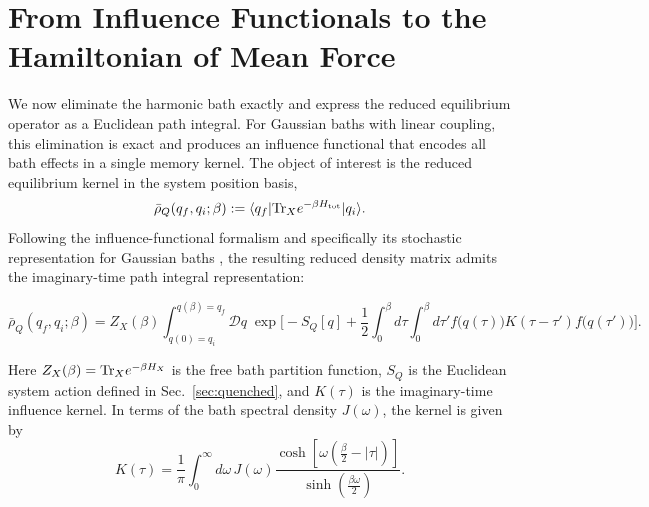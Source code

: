\section{\label{sec:influence_to_hmf}From Influence Functionals to the Hamiltonian of Mean Force}

We now eliminate the harmonic bath exactly and express the reduced equilibrium operator as a Euclidean path integral. For Gaussian baths with linear coupling, this elimination is exact and produces an influence functional that encodes all bath effects in a single memory kernel. The object of interest is the reduced equilibrium kernel in the system position basis,
\begin{equation}
    \bar\rho_Q(q_f,q_i;\beta) := \langle q_f|\mathrm{Tr}_X e^{-\beta H_{\mathrm{tot}}}|q_i\rangle.
    \label{eq:reduced_kernel_again}
\end{equation}
Following the influence-functional formalism \cite{feynmanTheoryGeneralQuantum1963a,caldeiraQuantumTunnellingDissipative1983a,grabertQuantumBrownianMotion1988} and specifically its stochastic representation for Gaussian baths \cite{mccaulPartitionfreeApproachOpen2017c, mccaulDrivingSpinbosonModels2018a, mccaulHowWinFriends2021b}, the resulting reduced density matrix admits the imaginary-time path integral representation:
\begin{widetext}
\begin{equation}
    \bar\rho_Q(q_f,q_i;\beta) = Z_X(\beta) \int_{q(0)=q_i}^{q(\beta)=q_f}\!\!\mathcal D q\; \exp\Bigg[ -S_Q[q] + \frac{1}{2}\int_0^\beta d\tau\int_0^\beta d\tau' f\big(q(\tau)\big) K(\tau-\tau') f\big(q(\tau')\big) \Bigg].
    \label{eq:reduced_effective_PI}
\end{equation}
\end{widetext}
Here $Z_X(\beta)=\mathrm{Tr}_X e^{-\beta H_X}$ is the free bath partition function, $S_Q$ is the Euclidean system action defined in Sec.~\ref{sec:quenched}, and $K(\tau)$ is the imaginary-time influence kernel. In terms of the bath spectral density $J(\omega)$, the kernel is given by
\begin{equation}
    K(\tau) = \frac{1}{\pi}\int_0^\infty d\omega\, J(\omega) \frac{\cosh\!\left[\omega\left(\frac{\beta}{2}-|\tau|\right)\right]} {\sinh\!\left(\frac{\beta\omega}{2}\right)}.
    \label{eq:kernel_spectral}
\end{equation}

